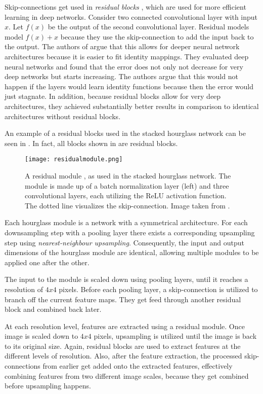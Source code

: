 Skip-connections get used in \textit{residual blocks} \cite{he_deep_2016}, which are used for more efficient learning in deep networks.
Consider two connected convolutional layer with input $x$.
Let $f(x)$ be the output of the second convolutional layer.
Residual models model $f(x) + x$ because they use the skip-connection to add the input back to the output.
The authors of \cite{he_deep_2016} argue that this allows for deeper neural network architectures because it is easier to fit identity mappings.
They evaluated deep neural networks and found that the error does not only not decrease for very deep networks but starts increasing.
The authors argue that this would not happen if the layers would learn identity functions because then the error would just stagnate.
In addition, because residual blocks allow for very deep architectures, they achieved substantially better results in comparison to identical architectures without residual blocks.

An example of a residual blocks used in the stacked hourglass network can be seen in .
In fact, all blocks shown in  are residual blocks.

\begin{figure}[htb!]
    \centering
    \texttt{[image: residualmodule.png]}
    \caption{A residual module \cite{he_deep_2016}, as used in the stacked hourglass network. The module is made up of a batch normalization layer (left) and three convolutional layers, each utilizing the ReLU activation function. The dotted line visualizes the skip-connection. Image taken from \cite{newell_stacked_2016}. }
    \label{fig:hg-residual}
\end{figure}

Each hourglass module is a network with a symmetrical architecture.
For each downsampling step with a pooling layer there exists a corresponding upsampling step using \textit{nearest-neighbour upsampling}.
Consequently, the input and output dimensions of the hourglass module are identical, allowing multiple modules to be applied one after the other.

The input to the module is scaled down using pooling layers, until it reaches a resolution of $4x4$ pixels.
Before each pooling layer, a skip-connection is utilized to branch off the current feature maps.
They get feed through another residual block and combined back later.

At each resolution level, features are extracted using a residual module.
Once image is scaled down to $4x4$ pixels, upsampling is utilized until the image is back to its original size.
Again, residual blocks are used to extract features at the different levels of resolution.
Also, after the feature extraction, the processed skip-connections from earlier get added onto the extracted features, effectively combining features from two different image scales, because they get combined before upsampling happens.

